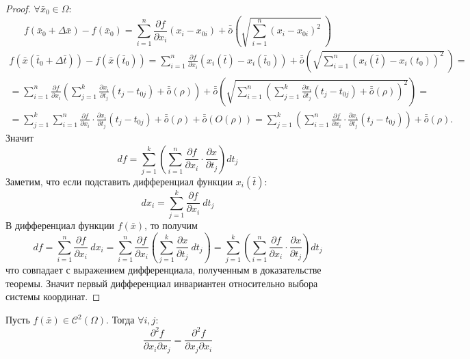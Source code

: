 \begin{proof}
    $\forall \bar{x}_0\in \Omega$:
    \[f(\bar{x}_0+\Delta \bar{x})-f(\bar{x}_0)=\sum\limits_{i=1}^{n}\frac{\partial {f}}{\partial {x_i}}(x_i-x_{0i})+\bar{\bar{o}}{\left(\sqrt{\sum\limits_{i=1}^{n}(x_i-x_{0i})^2}\ \right)}\]
    \begin{multline*}
        f(\bar{x}(\bar{t}_0+\Delta \bar{t}))-f(\bar{x}(\bar{t}_0))=\sum\limits_{i=1}^{n}\frac{\partial {f}}{\partial {x_i}}(x_i(\bar{t})-x_i(\bar{t}_0))+\bar{\bar{o}}{\left(\sqrt{\sum\limits_{i=1}^{n}(x_i(\bar{t})-x_i(t_0))^2}\ \right)}=\\
        =\sum\limits_{i=1}^{n}\frac{\partial {f}}{\partial {x_i}}\left(\sum\limits_{j=1}^{k}\frac{\partial {x_i}}{\partial {t_j}}(t_j-t_{0j})+\bar{\bar{o}}{(\rho)}\right)+\bar{\bar{o}}{\left(\sqrt{\sum\limits_{i=1}^{n}\left(\sum\limits_{j=1}^{k}\frac{\partial {x_i}}{\partial {t_j}}(t_j-t_{0j})+\bar{\bar{o}}{(\rho)}\right)^2}\right)}=\\
        =\sum\limits_{j=1}^{k}\sum\limits_{i=1}^{n}\frac{\partial {f}}{\partial {x_i}}\cdot \frac{\partial {x_i}}{\partial {t_j}}(t_j-t_{0j})+\bar{\bar{o}}{(\rho)}+\bar{\bar{o}}{(O(\rho))}=\sum\limits_{j=1}^{k}\left(\sum\limits_{i=1}^{n}\frac{\partial {f}}{\partial {x_i}}\cdot \frac{\partial {x_i}}{\partial {t_j}}(t_j-t_{0j})\right)+\bar{\bar{o}}{(\rho)}.
    \end{multline*}
    Значит
    \[df=\sum\limits_{j=1}^{k}\left(\sum\limits_{i=1}^{n}\frac{\partial {f}}{\partial {x_i}}\cdot \frac{\partial {x}}{\partial {t_j}}\right) dt_j\]
    Заметим, что если подставить дифференциал функции $x_i(\bar{t})$:
    \[dx_i=\sum\limits_{j=1}^{k}\frac{\partial {f}}{\partial {x_i}}\ dt_j\]
    В дифференциал функции $f(\bar{x})$, то получим
    \[df = \sum\limits_{i=1}^{n}\frac{\partial {f}}{\partial {x_i}}\ dx_i=\sum\limits_{i=1}^{n}\frac{\partial {f}}{\partial {x_i}}\left(\sum\limits_{j=1}^{k}\frac{\partial {x}}{\partial {t_j}}\ dt_j\right)=\sum\limits_{j=1}^{k}\left(\sum\limits_{i=1}^{n}\frac{\partial {f}}{\partial {x_i}}\cdot \frac{\partial {x}}{\partial {t_j}}\right) dt_j\]
    что совпадает с выражением дифференциала, полученным в доказательстве теоремы. Значит первый дифференциал инвариантен относительно выбора системы координат. 
\end{proof} 
\begin{theorem}
    Пусть $f(\bar{x})\in \mathcal{C}^2(\Omega)$. Тогда $\forall i,j:$
    \[\frac{\partial^2 {f}}{\partial {x_i}\partial{x_j}}=\frac{\partial^2 {f}}{\partial {x_j}\partial{x_i}}\]
\end{theorem} 

